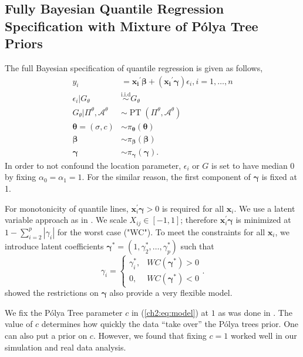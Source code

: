 \documentclass[12pt]{article}
\newcommand{\polya}{P\'{o}lya}
\newcommand{\iid}{\stackrel{\mbox{i.i.d}}{\sim}}
\DeclareMathOperator{\pt}{PT}
\begin{document}
\subsection{Fully Bayesian Quantile Regression Specification with
  Mixture of \polya{} Tree Priors}\label{ch2:sec:bayesmodel}
The full Bayesian specification of quantile regression is given as
follows,
\begin{equation}\label{ch2:eq:model}
\begin{aligned}
  y_i& = \bm{x_i}^{\prime}\bm{\beta} + (\bm{x_i}^{\prime}\bm{\gamma}) \epsilon_{i}, i = 1,
  \ldots,
  n \\
  \epsilon_i |G_{\theta} & \iid G_{\theta} \\
  G_{\theta}|\Pi^{\theta}, \mathcal{A}^{\theta} & \sim \pt
  (\Pi^{\theta}, \mathcal{A}^{\theta}) \\
  \bm{\theta} = (\sigma, c) & \sim \pi_{\bm \theta}(\bm \theta) \\
  \bm{\beta} & \sim \pi_{\bm \beta}(\bm \beta)\\
  \bm{\gamma} &\sim \pi_{\bm \gamma}(\bm \gamma).
\end{aligned}
\end{equation}
In order to not confound the location parameter, $\epsilon_i $ or $G$
is set to have median 0 by fixing $\alpha_0=\alpha_1 = 1$. For the
similar reason, the first component of $\bm{\gamma}$ is fixed at 1.

For monotonicity of quantile lines, $\bm x_i^{\prime} \bm \gamma > 0$ is required for all $\bm x_i$.
We use a latent variable approach as in \citet{reich2011}.
We scale $X_{ij} \in [-1, 1]$; therefore $\bm x_i^{\prime} \bm \gamma$ is minimized at $1 - \sum_{i = 2}^{p} |\gamma_i|$ for the worst case ("WC").
To meet the constraints for all $\bm x_i$, we introduce latent coefficients $\bm \gamma^{*} = (1, \gamma_2^{*}, \ldots, \gamma_p^{*})$ such that
\begin{displaymath}
\gamma_i =
\begin{cases}
\gamma_i^{*}, & WC(\bm \gamma^{*}) > 0 \\
0,            & WC(\bm \gamma^{*} ) < 0
\end{cases}.
\end{displaymath}
\citet{reich2013} showed the restrictions on $\bm \gamma$ also provide a very flexible model.

We fix the \polya{} Tree parameter $c$ in (\ref{ch2:eq:model}) at $1$ as was done in \citet{hanson2006}.
The value of $c$ determines how quickly the data ``take over'' the \polya{} trees prior.
One can also put a prior on $c$.
However, we found that fixing $c = 1$ worked well in our simulation and real data analysis.
\end{document}
